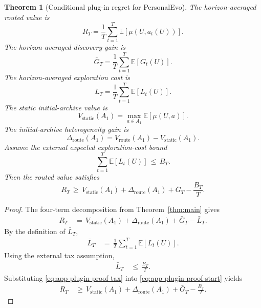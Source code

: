 \documentclass{article} %
\newtheorem{theorem}{Theorem}
\begin{document}
\begin{theorem}[Conditional plug-in regret for PersonalEvo]
\label{thm:convergence}
The horizon-averaged routed value is
\begin{equation}
\label{eq:app-plugin-rt}
R_T
=
\frac{1}{T}
\sum_{t=1}^{T}
\mathbb{E}[\mu(U,a_t(U))].
\end{equation}
The horizon-averaged discovery gain is
\begin{equation}
\label{eq:app-plugin-gbar}
\bar G_T
=
\frac{1}{T}
\sum_{t=1}^{T}
\mathbb{E}[G_t(U)].
\end{equation}
The horizon-averaged exploration cost is
\begin{equation}
\label{eq:app-plugin-lbar}
\bar L_T
=
\frac{1}{T}
\sum_{t=1}^{T}
\mathbb{E}[L_t(U)].
\end{equation}
The static initial-archive value is
\begin{equation}
\label{eq:app-plugin-vstatic}
V_{\mathrm{static}}(A_1)
=
\max_{a\in A_1}
\mathbb{E}[\mu(U,a)].
\end{equation}
The initial-archive heterogeneity gain is
\begin{equation}
\label{eq:app-plugin-delta}
\Delta_{\mathrm{route}}(A_1)
=
V_{\mathrm{route}}(A_1)-V_{\mathrm{static}}(A_1).
\end{equation}
Assume the external expected exploration-cost bound
\begin{equation}
\label{eq:app-plugin-tax-assumption}
\sum_{t=1}^{T}\mathbb{E}[L_t(U)]
\,\le\,
B_T.
\end{equation}
Then the routed value satisfies
\begin{equation}
\label{eq:app-plugin-bound}
R_T
\,\ge\,
V_{\mathrm{static}}(A_1)
+
\Delta_{\mathrm{route}}(A_1)
+
\bar G_T
-
\frac{B_T}{T}.
\end{equation}
\end{theorem}

\begin{proof}
The four-term decomposition from Theorem~\ref{thm:main} gives
\begin{align}
\label{eq:app-plugin-proof-start}
R_T
&\,=\,
V_{\mathrm{static}}(A_1)
+
\Delta_{\mathrm{route}}(A_1)
+
\bar G_T
-
\bar L_T.
\end{align}
By the definition of \(\bar L_T\),
\begin{align}
\label{eq:app-plugin-proof-lbar}
\bar L_T
&\,=\,
\frac{1}{T}
\sum_{t=1}^{T}
\mathbb{E}[L_t(U)].
\end{align}
Using the external tax assumption,
\begin{align}
\label{eq:app-plugin-proof-tax}
\bar L_T
&\,\le\,
\frac{B_T}{T}.
\end{align}
Substituting \eqref{eq:app-plugin-proof-tax} into \eqref{eq:app-plugin-proof-start} yields
\begin{align}
\label{eq:app-plugin-proof-final}
R_T
&\,\ge\,
V_{\mathrm{static}}(A_1)
+
\Delta_{\mathrm{route}}(A_1)
+
\bar G_T
-
\frac{B_T}{T}.
\end{align}
\end{proof}
\end{document}
